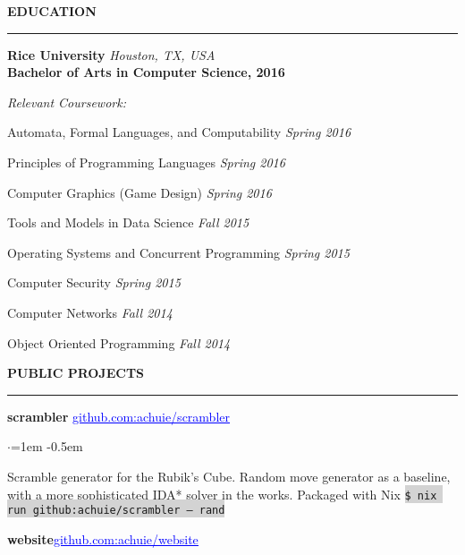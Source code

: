 \documentclass[10pt, a4paper]{article}
\newenvironment{aSection}[1]{
    \medskip \textbf{\uppercase{#1}}
    \smallskip
    \hrule
    \begin{list}{}{
            \setlength{\leftmargin}{1.5em}
        }
    \item[]
    }{
    \end{list}
}
\newenvironment{projSubsection}[2]{
    {#1} \hfill {#2}
    \smallskip
    \begin{list}{$\cdot$}{\leftmargin=1em}
    \itemsep -0.5em \vspace{-0.5em}
    }{
    \end{list}
    \vspace{0.5em}
}
\begin{document}
\begin{aSection}{Education} \textbf{Rice University} \hfill \textit{Houston, TX, USA}\\
    \textbf{Bachelor of Arts in Computer Science, 2016}

    \textit{Relevant Coursework:}
    \item Automata, Formal Languages, and Computability \hfill{\em Spring 2016}
    \item Principles of Programming Languages \hfill{\em Spring 2016}
    \item Computer Graphics (Game Design) \hfill{\em Spring 2016}
    \item Tools and Models in Data Science \hfill{\em Fall 2015}
    \item Operating Systems and Concurrent Programming \hfill{\em Spring 2015}
    \item Computer Security \hfill{\em Spring 2015} \item Computer Networks \hfill{\em Fall 2014}
    \item Object Oriented Programming \hfill{\em Fall 2014}
\end{aSection}

\begin{aSection}{Public Projects}
    \begin{projSubsection}
        {\textbf{scrambler}}
        {\href{https://www.github.com/achuie/scrambler}{\textcolor{blue}{\underline{github.com:achuie/scrambler}}}}
    \item[] Scramble generator for the Rubik's Cube. Random move generator as a baseline, with a more sophisticated IDA*
        solver in the works. Packaged with Nix \colorbox{lightgray}{\texttt{\$ nix run github:achuie/scrambler -- rand}}
    \end{projSubsection}

    \textbf{website}\hfill\href{https://www.github.com/achuie/website}{\textcolor{blue}{\underline{github.com:achuie/website}}}
\end{aSection}
\end{document}
